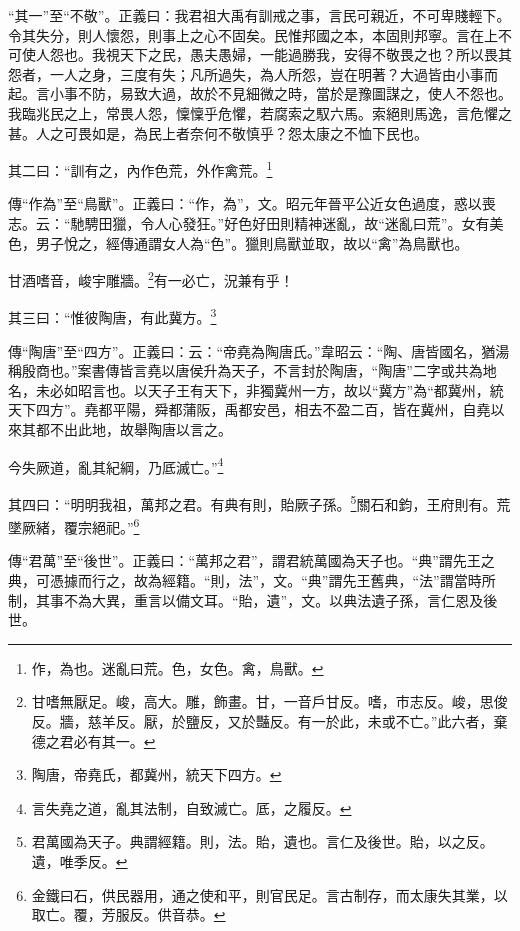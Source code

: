 {\noindent\shu{}\fzkt “其一”至“不敬”。正義曰：我君祖大禹有訓戒之事，言民可親近，不可卑賤輕下。令其失分，則人懷怨，則事上之心不固矣。民惟邦國之本，本固則邦寧。言在上不可使人怨也。我視天下之民，愚夫愚婦，一能過勝我，安得不敬畏之也？所以畏其怨者，一人之身，三度有失；凡所過失，為人所怨，豈在明著？大過皆由小事而起。言小事不防，易致大過，故於不見細微之時，當於是豫圖謀之，使人不怨也。我臨兆民之上，常畏人怨，懍懍乎危懼，若腐索之馭六馬。索絕則馬逸，言危懼之甚。人之可畏如是，為民上者奈何不敬慎乎？怨太康之不恤下民也。 \par}

其二曰：“訓有之，內作色荒，外作禽荒。\footnote{作，為也。迷亂曰荒。色，女色。禽，鳥獸。}

{\noindent\zhuan{}\fzbyks 傳“作為”至“鳥獸”。正義曰：“作，為”，文。昭元年晉平公近女色過度，惑以喪志。云：“馳騁田獵，令人心發狂。”好色好田則精神迷亂，故“迷亂曰荒”。女有美色，男子悅之，經傳通謂女人為“色”。獵則鳥獸並取，故以“禽”為鳥獸也。 \par}

甘酒嗜音，峻宇雕牆。\footnote{甘嗜無厭足。峻，高大。雕，飾畫。甘，一音戶甘反。嗜，市志反。峻，思俊反。牆，慈羊反。厭，於鹽反，又於豔反。有一於此，未或不亡。”此六者，棄德之君必有其一。}有一必亡，況兼有乎！

其三曰：“惟彼陶唐，有此冀方。\footnote{陶唐，帝堯氏，都冀州，統天下四方。}

{\noindent\zhuan{}\fzbyks 傳“陶唐”至“四方”。正義曰：云：“帝堯為陶唐氏。”韋昭云：“陶、唐皆國名，猶湯稱殷商也。”案書傳皆言堯以唐侯升為天子，不言封於陶唐，“陶唐”二字或共為地名，未必如昭言也。以天子王有天下，非獨冀州一方，故以“冀方”為“都冀州，統天下四方”。堯都平陽，舜都蒲阪，禹都安邑，相去不盈二百，皆在冀州，自堯以來其都不出此地，故舉陶唐以言之。 \par}

今失厥道，亂其紀綱，乃厎滅亡。”\footnote{言失堯之道，亂其法制，自致滅亡。厎，之履反。}

其四曰：“明明我祖，萬邦之君。有典有則，貽厥子孫。\footnote{君萬國為天子。典謂經籍。則，法。貽，遺也。言仁及後世。貽，以之反。遺，唯季反。}關石和鈞，王府則有。荒墜厥緒，覆宗絕祀。”\footnote{金鐵曰石，供民器用，通之使和平，則官民足。言古制存，而太康失其業，以取亡。覆，芳服反。供音恭。}


{\noindent\zhuan{}\fzbyks 傳“君萬”至“後世”。正義曰：“萬邦之君”，謂君統萬國為天子也。“典”謂先王之典，可憑據而行之，故為經籍。“則，法”，文。“典”謂先王舊典，“法”謂當時所制，其事不為大異，重言以備文耳。“貽，遺”，文。以典法遺子孫，言仁恩及後世。 \par}

